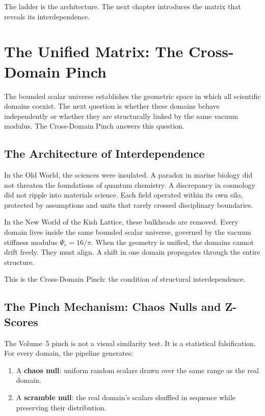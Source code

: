 \documentclass[11pt, letterpaper, openany]{book}
\begin{document}
The ladder is the architecture.
The next chapter introduces the matrix that reveals its interdependence.

\chapter{The Unified Matrix: The Cross-Domain Pinch}

The bounded scalar universe establishes the geometric space in which all scientific domains
coexist. The next question is whether these domains behave independently or whether they are
structurally linked by the same vacuum modulus. The Cross-Domain Pinch answers this question.

\section*{The Architecture of Interdependence}
In the Old World, the sciences were insulated. A paradox in marine biology did not threaten the
foundations of quantum chemistry. A discrepancy in cosmology did not ripple into materials
science. Each field operated within its own silo, protected by assumptions and units that rarely
crossed disciplinary boundaries.

In the New World of the Kish Lattice, these bulkheads are removed. Every domain lives inside the
same bounded scalar universe, governed by the vacuum stiffness modulus $\Psi_v = 16/\pi$.
When the geometry is unified, the domains cannot drift freely. They must align. A shift in one
domain propagates through the entire structure.

This is the Cross-Domain Pinch: the condition of structural interdependence.

\section*{The Pinch Mechanism: Chaos Nulls and Z-Scores}
The Vol\-ume~5 pinch is not a visual similarity test. It is a statistical falsification. For every
domain, the pipeline generates:

\begin{enumerate}
    \item A \textbf{chaos null}: uniform random scalars drawn over the same range as the real domain.
    \item A \textbf{scramble null}: the real domain's scalars shuffled in sequence while preserving
    their distribution.
\end{enumerate}
\end{document}
